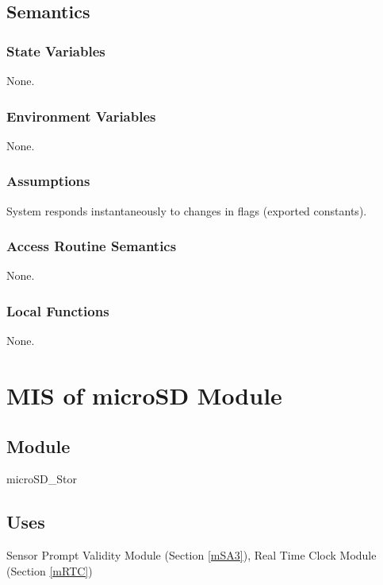 \documentclass[12pt, titlepage]{article}
\begin{document}
\subsection{Semantics}

\subsubsection{State Variables}

None.

\subsubsection{Environment Variables}

None.

\subsubsection{Assumptions}

System responds instantaneously to changes in flags (exported constants).

\subsubsection{Access Routine Semantics}

None.

\subsubsection{Local Functions}

None.

\newpage


\section{MIS of microSD Module} \label{mDS_1} 

\subsection{Module}

microSD\_Stor

\subsection{Uses}

Sensor Prompt Validity Module (Section \ref{mSA3}), Real Time Clock Module (Section \ref{mRTC})    %
\end{document}
